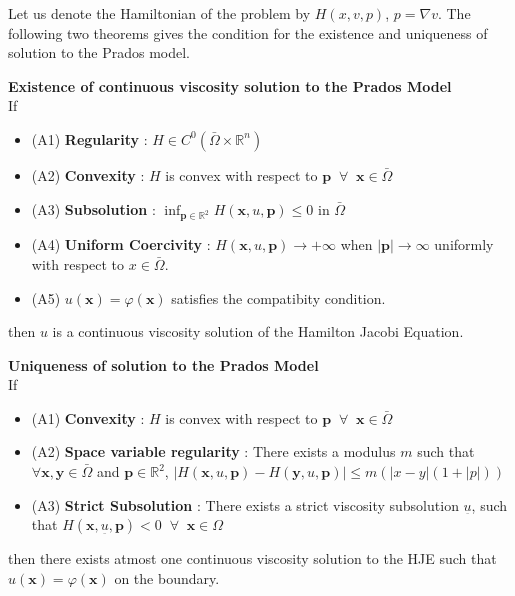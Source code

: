 \noindent
Let us denote the Hamiltonian of the problem by $H(x,v,p)$, $p =
\nabla v$. The following two theorems gives the condition for the
existence and uniqueness of solution to the Prados model.
\begin{theorem}
  \textbf{Existence of continuous viscosity solution to the Prados
    Model}\\
  If
  \begin{itemize}
  \item
    (A1) \textbf{Regularity} : $H \in C^0(\bar{\Omega} \times \mathbb{R}^n)$
  \item
    (A2) \textbf{Convexity} : $H$ is convex with respect to $\mathbf{p} \;\;\forall
    \;\;\mathbf{x} \in \bar{\Omega}$
  \item
    (A3) \textbf{Subsolution} : $\inf_{\mathbf{p} \in \mathbb{R}^2}
    H(\mathbf{x},u,\mathbf{p}) \le 0 $ in $\bar{\Omega}$
  \item
    (A4) \textbf{Uniform Coercivity} : $H(\mathbf{x},u,\mathbf{p}) \to +\infty$
    when $|\mathbf{p}| \to \infty$ uniformly with respect to $x \in
    \bar{\Omega}$.
  \item
    (A5) $u(\mathbf{x}) = \varphi(\mathbf{x})$ satisfies the compatibity condition.
  \end{itemize}
  then $u$ is a continuous viscosity solution of the Hamilton Jacobi Equation.
\end{theorem}

\begin{theorem}
  \textbf{Uniqueness of solution to the Prados
    Model}\\
  If
  \begin{itemize}
  \item
    (A1) \textbf{Convexity} : $H$ is convex with respect to $\mathbf{p} \;\;\forall
    \;\;\mathbf{x} \in \bar{\Omega}$
  \item
    (A2) \textbf{Space variable regularity} : There exists a modulus $m$ such
    that $\forall \mathbf{x},\mathbf{y} \in \bar{\Omega}$ and
    $\mathbf{p}\in\mathbb{R}^2$, $|H(\mathbf{x},u,\mathbf{p}) -
    H(\mathbf{y},u,\mathbf{p})| \le m(|x-y|(1+|p|))$
  \item
    (A3) \textbf{Strict Subsolution} : There exists a strict viscosity
    subsolution $\underset{\bar{}}{u}$, such that
    $H(\mathbf{x},\underset{\bar{}}{u}, \mathbf{p}) < 0 \;\; \forall
    \;\; \mathbf{x}\in\Omega$
  \end{itemize}
  then there exists atmost one continuous viscosity solution to the
  HJE such that $u(\mathbf{x}) = \varphi(\mathbf{x})$ on the boundary.
\end{theorem}

